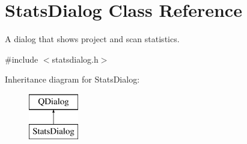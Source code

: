 \hypertarget{class_stats_dialog}{\section{Stats\-Dialog Class Reference}
\label{class_stats_dialog}
}


A dialog that shows project and scan statistics.  




{\ttfamily \#include $<$statsdialog.\-h$>$}

Inheritance diagram for Stats\-Dialog\-:\begin{figure}[H]
\begin{center}
\leavevmode
\includegraphics[height=2.000000cm]{class_stats_dialog}
\end{center}
\end{figure}
